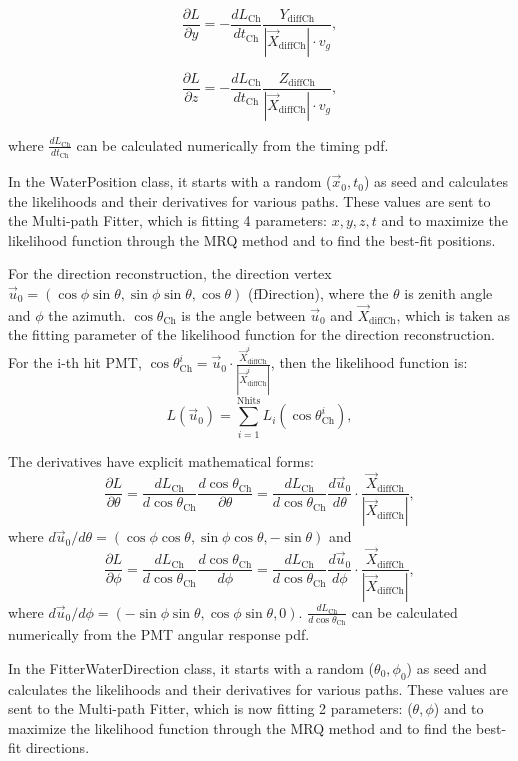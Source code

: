 \[
\frac{\partial L}{\partial y}=-\frac{dL_{\mathrm{Ch}}}{dt_{\mathrm{Ch}}}\frac{Y_{{\mathrm{diffCh}}}}{|\vec{X}_{{\mathrm{diffCh}}}|\cdot v_g},
\]

\[
\frac{\partial L}{\partial z}=-\frac{dL_{\mathrm{Ch}}}{dt_{\mathrm{Ch}}}\frac{Z_{{\mathrm{diffCh}}}}{|\vec{X}_{{\mathrm{diffCh}}}|\cdot v_g},
\]

where $\frac{dL_{\mathrm{Ch}}}{dt_{\mathrm{Ch}}}$ can be calculated numerically from the timing pdf. 

In the WaterPosition class, it starts with a random ($\vec{x}_0,t_0$) as seed and calculates the likelihoods and their derivatives for various paths. These values are sent to the Multi-path Fitter, which is fitting 4 parameters: $x,y,z,t$ and to maximize the likelihood function through the MRQ method and to find the best-fit positions.

For the direction reconstruction, the direction vertex $\vec{u}_{0}=(\cos\phi\sin\theta,\sin\phi\sin\theta,\cos\theta)$ ($\mathrm{fDirection}$), where the $\theta$ is zenith angle and $\phi$ the azimuth. $\cos\theta_{\mathrm{Ch}}$ is the angle between $\vec{u}_{0}$ and $\vec{X}_{{\mathrm{diffCh}}}$, which is taken as the fitting parameter of the likelihood function for the direction reconstruction. For the i-th hit PMT, $\cos\theta^i_{\mathrm{Ch}}=\vec{u}_0\cdot\frac{\vec{X}^i_{{\mathrm{diffCh}}}}{|\vec{X}^i_{{\mathrm{diffCh}}}|}$, then the likelihood function is:
\[
L(\vec{u}_0)=\sum_{i=1}^{{\mathrm{Nhits}}}L_i(\cos\theta_{\mathrm{Ch}}^i),
\]

The derivatives have explicit mathematical forms:
\[
\frac{\partial L}{\partial\theta}=\frac{dL_{\mathrm{Ch}}}{d\cos\theta_{\mathrm{Ch}}}\frac{d\cos\theta_{\mathrm{Ch}}}{\partial\theta}
=\frac{dL_{\mathrm{Ch}}}{d\cos\theta_{\mathrm{Ch}}}\frac{d\vec{u}_0}{d\theta}\cdot\frac{\vec{X}_{{\mathrm{diffCh}}}}{|\vec{X}_{{\mathrm{diffCh}}}|},
\]
where $d\vec{u}_0/d\theta=(\cos\phi\cos\theta, \sin\phi\cos\theta, -\sin\theta)$ and 
\[
\frac{\partial　L}{\partial\phi}=\frac{dL_{\mathrm{Ch}}}{d\cos\theta_{\mathrm{Ch}}}\frac{d\cos\theta_{\mathrm{Ch}}}{d\phi}
=\frac{dL_{\mathrm{Ch}}}{d\cos\theta_{\mathrm{Ch}}}\frac{d\vec{u}_0}{d\phi}\cdot\frac{\vec{X}_{{\mathrm{diffCh}}}}{|\vec{X}_{{\mathrm{diffCh}}}|},
\] where $d\vec{u}_0/d\phi=(-\sin\phi\sin\theta, \cos\phi\sin\theta, 0)$. $\frac{dL_{\mathrm{Ch}}}{d\cos\theta_{\mathrm{Ch}}}$ can be calculated numerically from the PMT angular response pdf.

In the FitterWaterDirection class, it starts with a random ($\theta_0,\phi_0$) as seed and calculates the likelihoods and their derivatives for various paths. These values are sent to the Multi-path Fitter, which is now fitting 2 parameters: ($\theta,\phi$) and to maximize the likelihood function through the MRQ method and to find the best-fit directions.

